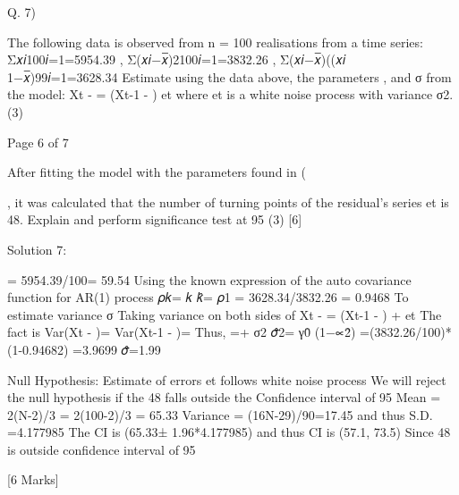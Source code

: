 
Q. 7)
\item The following data is observed from n = 100 realisations from a time series:
Σ𝑥𝑖100𝑖=1=5954.39 , Σ(𝑥𝑖−𝑥̅)2100𝑖=1=3832.26 , Σ(𝑥𝑖−𝑥̅)((𝑥𝑖 1−𝑥̅)99𝑖=1=3628.34
Estimate using the data above, the parameters \mu , \alpha  and σ from the model:
Xt - \mu = \alpha  (Xt-1 - \mu )   et
where et is a white noise process with variance σ2.
(3)

Page 6 of 7
\item After fitting the model with the parameters found in (\item, it was calculated that the number of turning points of the residual’s series et is 48. 
Explain and perform significance test at 95%
(3)
[6]



Solution 7:
\item
\mu  = 5954.39/100= 59.54
Using the known expression of the auto covariance function for AR(1) process 𝜌𝑘= \alpha 𝑘
\alpha 𝑘̂= 𝜌1 = 3628.34/3832.26 = 0.9468
To estimate variance σ
Taking variance on both sides of Xt - \mu = \alpha  (Xt-1 - \mu ) + et
The fact is Var(Xt - \mu )= Var(Xt-1 - \mu )= 
Thus, =+ σ2
𝜎̂2= γ0̂ (1−∝2̂)
=(3832.26/100)*(1-0.94682)
=3.9699
𝜎̂=1.99

\item
Null Hypothesis: Estimate of errors et follows white noise process
We will reject the null hypothesis if the 48 falls outside the Confidence interval of 95%
Mean = 2(N-2)/3 = 2(100-2)/3 = 65.33
Variance = (16N-29)/90=17.45 and thus S.D. =4.177985
The CI is (65.33± 1.96*4.177985) and thus CI is (57.1, 73.5)
Since 48 is outside confidence interval of 95%

[6 Marks]

